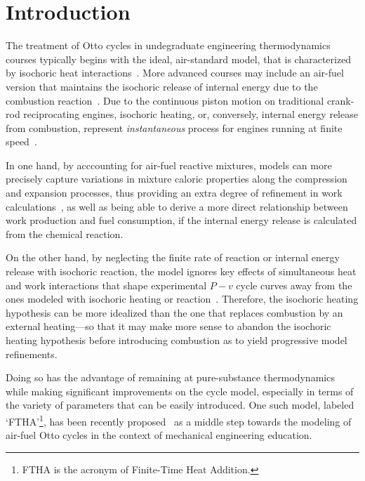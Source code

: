 \section{Introduction}

    The treatment of  Otto  cycles  in  undegraduate  engineering  thermodynamics  courses  typically  begins  with  the  ideal,
    air-standard  model,  that  is  characterized   by   isochoric   heat   interactions~\cite{2014-CengelYA+BolesMA-McGrawHill,
    2002-MoranMJ+ShapiroHN-LTC, 1985-WylenG-Wiley, 2015-KroosKA+PotterMC-Cengage}. More advanced courses may include an air-fuel
    version    that    maintains    the    isochoric    release    of    internal    energy    due     to     the     combustion
    reaction~\cite{2012-BrunettiF-Blucher}. Due to the continuous piston motion on traditional crank-rod reciprocating  engines,
    isochoric heating, or, conversely, internal energy release  from  combustion,  represent  \emph{instantaneous}  process  for
    engines running at finite speed~\cite{2017-NaaktgeborenC-IntJMechEngEduc}.

    In one hand, by acccounting for air-fuel reactive mixtures, models can more precisely capture variations in mixture  caloric
    properties along  the  compression  and  expansion  processes,  thus  providing  an  extra  degree  of  refinement  in  work
    calculations~\cite{2012-BrunettiF-Blucher}, as well as being  able  to  derive  a  more  direct  relationship  between  work
    production and fuel consumption, if the internal energy release is calculated from the chemical reaction.

    On the other hand, by neglecting the finite rate of reaction or internal energy release with isochoric reaction,  the  model
    ignores key effects of simultaneous heat and work interactions that shape experimental $P-v$ cycle curves away from the ones
    modeled with isochoric heating or reaction~\cite{2013-MartinsJJG-Publindustria}. Therefore, the isochoric heating hypothesis
    can be more idealized than the one that replaces combustion by an external heating---so that  it  may  make  more  sense  to
    abandon the isochoric heating hypothesis before introducing combustion as to yield progressive model refinements.

    Doing so has the advantage of remaining at pure-substance thermodynamics while making significant improvements on the  cycle
    model, especially in terms  of  the  variety  of  parameters  that  can  be  easily  introduced.  One  such  model,  labeled
    `FTHA'\footnote{FTHA    is     the     acronym     of     Finite-Time     Heat     Addition.},     has     been     recently
    proposed~\cite{2017-NaaktgeborenC-IntJMechEngEduc} as a middle step towards the modeling of  air-fuel  Otto  cycles  in  the
    context of mechanical engineering education.

